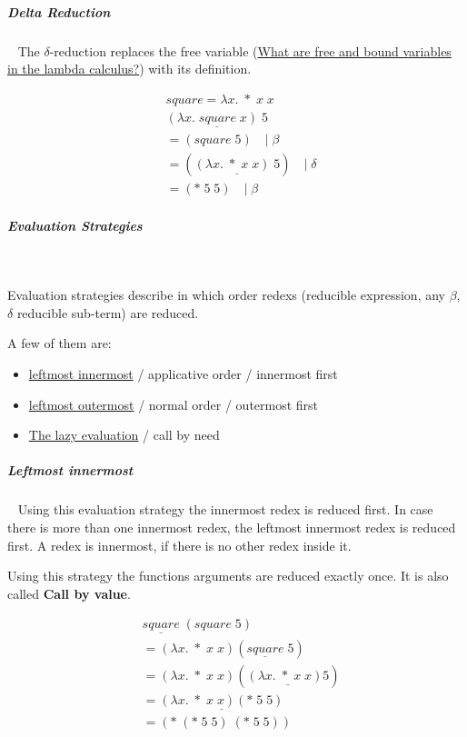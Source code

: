 \documentclass[11pt,twoside,landscape]{article}
\begin{document}
\begin{multicols}{3}
\subparagraph{Delta Reduction} \
\label{sec:orgd1a7631}
The \(\delta\)-reduction replaces the free variable (\href{../../../roam/20220616081515-what_are_free_and_bound_variables_in_the_lambda_calculs.org}{What are free and bound variables in the lambda calculus?}) with its definition.

\begin{equation}
  \label{}
  \begin{align}
    &square = \lambda x. \; * \; x \; x \\
    &\underline{(\lambda x. \; square \; x) \; 5} \\
    &= (square \; 5) \quad | \; \beta \\
    &= (\underline{(\lambda x. \; * \; x \; x) \; 5}) \quad | \; \delta \\
    &= (* \; 5 \; 5) \quad | \; \beta
  \end{align}
\end{equation}

\subparagraph{Evaluation Strategies} \
\label{sec:org218fbd6}

Evaluation strategies describe in which order redexs (reducible expression, any \(\beta\), \(\delta\) reducible sub-term) are reduced.


A few of them are:
\begin{itemize}
\item \href{../../../roam/20220616093057-the_leftmost_innermost_evaluation_strategy.org}{leftmost innermost} / applicative order / innermost first
\item \href{../../../roam/20220616104603-the_leftmost_outermost_evaluation_strategy.org}{leftmost outermost} / normal order / outermost first
\item \href{../../../roam/20220616110146-the_lazy_evaluation.org}{The lazy evaluation} / call by need
\end{itemize}


\subparagraph{Leftmost innermost} \
\label{sec:orgd35e7e7}
Using this evaluation strategy the innermost redex is reduced first.
In case there is more than one innermost redex, the leftmost innermost redex is reduced first.
A redex is innermost, if there is no other redex inside it.

Using this strategy the functions arguments are reduced exactly once.
It is also called \textbf{Call by value}.

\begin{equation}
  \label{eqn:example-of-leftmost-innermost}
  \begin{align}
    &\underline{square} \; (square \; 5) \\
    &= (\lambda x. \; * \; x \; x) (\underline{square} \; 5) \\
    &= (\lambda x. \; * \; x \; x) (\underline{(\lambda x. \; * \; x \; x) 5}) \\
    &= \underline{(\lambda x. \; * \; x \; x) (* \; 5 \; 5)} \\
    &= (* \; (* \; 5 \; 5) \; (* \; 5 \; 5))
  \end{align}
\end{equation}


\end{multicols}
\end{document}
